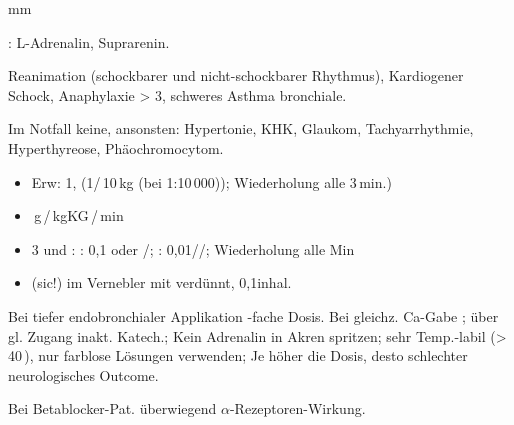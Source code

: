 \begin{labeling}[:]{mm}
  \item[Präp] : L-Adrenalin,  Suprarenin.
  \item[Ind] Reanimation (schockbarer und nicht-schockbarer Rhythmus),
  Kardiogener Schock, Anaphylaxie > 3{\textdegree},  schweres Asthma bronchiale.
  \item[KI]Im Notfall keine, ansonsten:
  Hypertonie, KHK, Glaukom, Tachyarrhythmie, Hyperthyreose,
  Phäochromocytom.
  \item[\textrecipe]
  \begin{itemize}
    \item {} Erw: 1\Mg, 
    (1\Ml*/\,10\,kg (bei 1:10\,000)); Wiederholung alle 3\,min.)
    \item {}
    \,{\textmu}g\,/\,kgKG\,/\,min
    \item {} 3{\textdegree} und : 
    : 0,1\Mg* {} oder \Mg* {}/; 
    : 0,01\MgKg//; 
    Wiederholung alle  Min
    \item {}  (sic!) im Vernebler  mit 
    verdünnt, 0,1\MgKg* inhal.
  \end{itemize}
  \item[Anm] Bei tiefer endobronchialer Applikation -fache Dosis.
  Bei gleichz. Ca-Gabe ;  über gl. Zugang inakt.
  Katech.; Kein Adrenalin in Akren spritzen; sehr Temp.-labil
  ({\textgreater}\,40\,{\textcelsius}), nur farblose Lösungen verwenden; Je höher die
  Dosis, desto schlechter neurologisches Outcome.
  \item[Cave] Bei Betablocker-Pat. überwiegend
  {$\alpha$}-Rezeptoren-Wirkung.
\end{labeling}

\subsection{}





